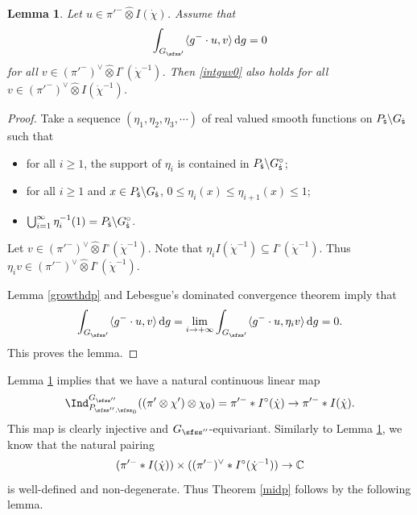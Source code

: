 \documentclass[11pt,a4paper]{amsart}
\newcommand{\od}{\operatorname{d}}
\newcommand{\la}{\langle}
\newcommand{\ra}{\rangle}
\numberwithin{equation}{section}
\newtheorem{lem}[thm]{Lemma}
\theoremstyle{remark}
\def\subset{\subseteq}
\begin{document}
\begin{lem}\label{imb}
Let $u\in \pi'^- \widehat \otimes{ I(\dot \chi)}$. Assume that
\begin{equation}\label{intguv0}
  \int_{G_{\sfss'}} \la g^-\cdot u, v\ra\od\! g =0
\end{equation}
for all $v\in (\pi'^-)^\vee \widehat \otimes I^\circ (\dot \chi^{-1})$. Then \eqref{intguv0} also holds for all $v\in (\pi'^-)^\vee \widehat \otimes I(\dot \chi^{-1})$.
\end{lem}

\begin{proof}
Take a sequence $(\eta_1, \eta_2, \eta_3, \cdots)$ of real valued smooth functions on $P_{{\dot{\mathsf s}}}\backslash G_{{\dot{\mathsf s}}}$ such that
\begin{itemize}
\item
for all $i\geq 1$,  the support of $\eta_i$ is contained in $P_{\dot{\mathsf s}} \backslash  G_{\dot{\mathsf s}}^\circ$;
\item for all $i\geq 1$ and  $x\in  P_{{\dot{\mathsf s}}}\backslash G_{{\dot{\mathsf s}}}$, $ 0\leq  \eta_i(x)\leq \eta_{i+1}(x)\leq 1$; \smallskip
 \item
 $\bigcup_{i=1}^\infty \eta_i^{-1}(1)= P_{{\dot{\mathsf s}}}\backslash G_{{\dot{\mathsf s}}}^\circ$.
\end{itemize}
Let $v\in  (\pi'^-)^\vee \widehat \otimes I^\circ (\dot \chi^{-1})$. Note that $\eta_i  I (\dot \chi^{-1})\subset  I^\circ (\dot \chi^{-1})$. Thus $\eta_i v\in (\pi'^-)^\vee \widehat \otimes  I^\circ (\dot \chi^{-1})$.

Lemma \ref{growthdp} and  Lebesgue's dominated convergence theorem imply that
\[
  \int_{G_{\sfss'}} \la g^-\cdot u, v\ra\od\! g
  =\lim_{i\rightarrow +\infty}  \int_{G_{\sfss'}} \la g^-\cdot u, \eta_i v\ra \od\! g =0.
\]
This proves the lemma.
\end{proof}

Lemma \ref{imb} implies that we have a natural continuous  linear map
\[
 \Ind_{P_{\sfss'',\sfss_0}}^{G_{\sfss''}} ((\pi'\otimes  \chi')\otimes \chi_0)= \pi'^-* I^\circ (\dot \chi)\rightarrow \pi'^-* I(\dot \chi).
\]
This map is clearly  injective and $G_{\sfss''}$-equivariant. Similarly to Lemma \ref{imb}, we know that the natural pairing
\[
 ( \pi'^-* I(\dot \chi))\times( (\pi'^-)^\vee* I^\circ(\dot \chi^{-1}))\rightarrow \mathbb{C}
\]
is well-defined and non-degenerate. Thus Theorem \ref{midp} follows by the following lemma.
\end{document}
